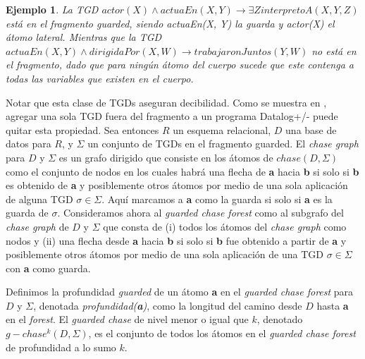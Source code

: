 \documentclass[11pt,a4paper,twoside]{tesis}
\newtheorem{exmp}{Ejemplo}
\begin{document}
\begin{exmp}\label{ejemplo_guarded}
    La TGD $actor(X) \land actuaEn(X, Y) \rightarrow \exists Z interpretoA(X, Y, Z)$ está en el fragmento \textit{guarded}, siendo \textit{actuaEn(X, Y)} la guarda y \textit{actor(X)} el átomo lateral. Mientras que la TGD $actuaEn(X, Y) \land dirigidaPor(X, W) \rightarrow trabajaronJuntos(Y, W)$ no está en el fragmento, dado que para ningún átomo del cuerpo sucede que este contenga a todas las variables que existen en el cuerpo. 
\end{exmp}
Notar que esta clase de TGDs aseguran decibilidad. Como se muestra en \cite{cali}, agregar una sola TGD fuera del fragmento a un programa Datalog+/- puede quitar esta propiedad.
Sea entonces $R$ un esquema relacional, $D$ una base de datos para $R$, y $\Sigma$ un conjunto de TGDs en el fragmento guarded. El \textit{chase graph} para $D$ y $\Sigma$ es un grafo dirigido que consiste en los átomos de $chase(D,\Sigma)$ como el conjunto de nodos en los cuales habrá una flecha de \textbf{a} hacia \textbf{b} si solo si \textbf{b} es obtenido de \textbf{a} y posiblemente otros átomos por medio de una sola aplicación de alguna TGD $\sigma \in \Sigma$. Aquí marcamos a \textbf{a} como la guarda si solo si \textbf{a} es la guarda de $\sigma$. Consideramos ahora al \textit{guarded chase forest} como al subgrafo del \textit{chase graph} de $D$ y $\Sigma$ que consta de (i) todos los átomos del \textit{chase graph} como nodos y (ii) una flecha desde \textbf{a} hacia \textbf{b} si solo si \textbf{b} fue obtenido a partir de \textbf{a} y posiblemente otros átomos por medio de una sola aplicación de una TGD $\sigma \in \Sigma$ con \textbf{a} como guarda.

Definimos la profundidad \textit{guarded} de un átomo \textbf{a} en el \textit{guarded chase forest} para $D$ y $\Sigma$, denotada \textit{profundidad(\textbf{a})}, como la longitud del camino desde $D$ hasta \textbf{a} en el \textit{forest}. El \textit{guarded chase} de nivel menor o igual que $k$, denotado $g-chase^k(D, \Sigma)$, es el conjunto de todos los átomos en el \textit{guarded chase forest} de profundidad a lo sumo $k$.
\end{document}
